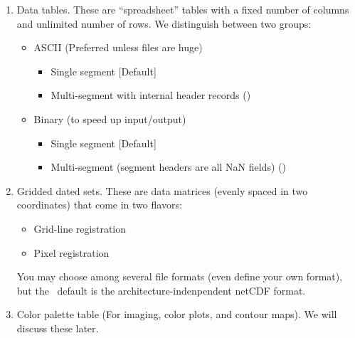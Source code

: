 \documentclass[11pt]{report}
\begin{document}
\begin{enumerate}

\item Data tables.
These are ``spreadsheet'' tables with a fixed number of columns and
unlimited number of rows.  We distinguish between two groups:

\begin{itemize}

\item ASCII (Preferred unless files are huge)

\begin{itemize}

\item Single segment [Default]

\item Multi-segment with internal header records ()
\end{itemize}

\item Binary (to speed up input/output)

\begin{itemize}

\item Single segment [Default]

\item Multi-segment (segment headers are all NaN fields) ()
\end{itemize}

\end{itemize}

\item Gridded dated sets.
These are data matrices (evenly spaced in two coordinates) that come
in two flavors:

\begin{itemize}

\item Grid-line registration

\item Pixel registration

\end{itemize}

You may choose among several file formats (even define your own format),
but the \GMT\ default is the architecture-indenpendent netCDF format.

\item Color palette table (For imaging, color plots, and contour maps).
We will discuss these later.

\end{enumerate}
\end{document}
